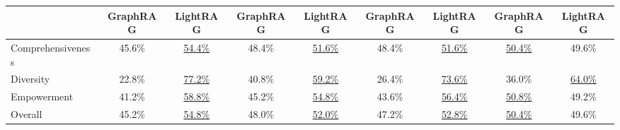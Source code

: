 \documentclass{article} %
\begin{document}
\begin{table}[t]
{\begin{tabular}{@{}lcccccccc@{}}
\cmidrule(lr){2-3} \cmidrule(lr){4-5} \cmidrule(lr){6-7} \cmidrule(lr){8-9}
                      & GraphRAG & \textbf{LightRAG} & GraphRAG & \textbf{LightRAG} & GraphRAG & \textbf{LightRAG} & GraphRAG & \textbf{LightRAG} \\
\midrule
Comprehensiveness      & 45.6\%      & \underline{54.4\%}     & 48.4\%      & \underline{51.6\%}     &  48.4\%     & \underline{51.6\%}     & \underline{50.4\%}      & 49.6\%     \\
Diversity              & 22.8\%      & \underline{77.2\%}     & 40.8\%      & \underline{59.2\%}     &  26.4\%     & \underline{73.6\%}     & 36.0\%      & \underline{64.0\%}     \\
Empowerment            & 41.2\%      & \underline{58.8\%}     & 45.2\%      & \underline{54.8\%}     & 43.6\%      & \underline{56.4\%}     & \underline{50.8\%}      & 49.2\%     \\
Overall                & 45.2\%      & \underline{54.8\%}     & 48.0\%      & \underline{52.0\%}     & 47.2\%      & \underline{52.8\%}     & \underline{50.4\%}      & 49.6\%     \\
\bottomrule
\end{tabular}
}
\end{table}
\end{document}
